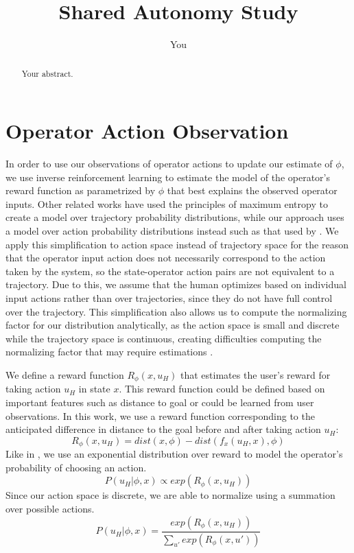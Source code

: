 \documentclass[a4paper]{article}
\title{Shared Autonomy Study}
\author{You}
\begin{document}
\maketitle

\begin{abstract}
Your abstract.
\end{abstract}

\section{Operator Action Observation}

In order to use our observations of operator actions to update our estimate of $\phi$, we use inverse reinforcement learning to estimate the model of the operator's reward function as parametrized by $\phi$ that best explains the observed operator inputs. Other related works \cite{dragan2012formalizing, javdani2015shared} have used the principles of maximum entropy \cite{ziebart2008maximum} to create a model over trajectory probability distributions, while our approach uses a model over action probability distributions instead such as that used by \citet{ramachandran2007bayesian}. We apply this simplification to action space instead of trajectory space for the reason that the operator input action does not necessarily correspond to the action taken by the system, so the state-operator action pairs are not equivalent to a trajectory. Due to this, we assume that the human optimizes based on individual input actions rather than over trajectories, since they do not have full control over the trajectory. This simplification also allows us to compute the normalizing factor for our distribution analytically, as the action space is small and discrete while the trajectory space is continuous, creating difficulties computing the normalizing factor that may require estimations \cite{javdani2015shared}.

We define a reward function $R_\phi (x, u_H)$ that estimates the user's reward for taking action $u_H$ in state $x$. This reward function could be defined based on important features such as distance to goal or could be learned from user observations. In this work, we use a reward function corresponding to the anticipated difference in distance to the goal before and after taking action $u_H$: 
\[
R_\phi (x, u_H) = dist(x, \phi) - dist(f_x(u_H, x), \phi)
\]
Like in \cite{ramachandran2007bayesian}, we use an exponential distribution over reward to model the operator's probability of choosing an action.
\[
P(u_H|\phi, x) \propto exp(R_\phi (x, u_H))
\]
Since our action space is discrete, we are able to normalize using a summation over possible actions.
\[
P(u_H|\phi, x) = \frac{exp(R_\phi (x, u_H))}{\sum_{u'} exp(R_\phi (x, u'))}
\]
\end{document}
